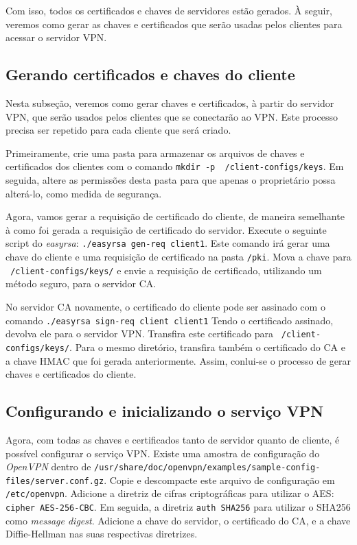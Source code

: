 \documentclass[12pt]{article}
\begin{document}
\begin{flushleft}
Com isso, todos os certificados e chaves de servidores estão gerados. À seguir, veremos como gerar as chaves 
e certificados que serão usadas pelos clientes para acessar o servidor VPN.


\subsection{Gerando certificados e chaves do cliente}

Nesta subseção, veremos como gerar chaves e certificados, à partir do servidor VPN, que serão usados
pelos clientes que se conectarão ao VPN. Este processo precisa ser repetido para cada cliente que será criado.

Primeiramente, crie uma pasta para armazenar os arquivos de chaves e certificados dos clientes com o 
comando \texttt{mkdir -p ~/client-configs/keys}. Em seguida, altere as permissões desta pasta para que apenas o proprietário
possa alterá-lo, como medida de segurança. 

Agora, vamos gerar a requisição de certificado do cliente, de maneira semelhante à como foi gerada a requisição de certificado
do servidor. Execute o seguinte script do \emph{easyrsa}: \texttt{./easyrsa gen-req client1}. Este comando irá gerar 
uma chave do cliente e uma requisição de certificado na pasta \texttt{/pki}. Mova a chave para \texttt{~/client-configs/keys/}
e envie a requisição de certificado, utilizando um método seguro, para o servidor CA. 

No servidor CA novamente, o certificado do cliente pode ser assinado com o comando \texttt{./easyrsa sign-req client client1}
Tendo o certificado assinado, devolva ele para o servidor VPN. Transfira este certificado para \texttt{~/client-configs/keys/}.
Para o mesmo diretório, transfira também o certificado do CA e a chave HMAC que foi gerada anteriormente. Assim, conlui-se 
o processo de gerar chaves e certificados do cliente.

\subsection{Configurando e inicializando o serviço VPN}

Agora, com todas as chaves e certificados tanto de servidor quanto de cliente, é possível configurar o serviço VPN.
Existe uma amostra de configuração do \emph{OpenVPN} dentro de \texttt{/usr/share/doc/openvpn/examples/sample-config-files/server.conf.gz}.
Copie e descompacte este arquivo de configuração em \texttt{/etc/openvpn}. Adicione a diretriz de cifras criptográficas para utilizar o AES: 
\texttt{cipher AES-256-CBC}. Em seguida, a diretriz \texttt{auth SHA256} para utilizar o SHA256 como \emph{message digest}. Adicione a chave do servidor,
o certificado do CA, e a chave Diffie-Hellman nas suas respectivas diretrizes. 


\end{flushleft}
\end{document}
